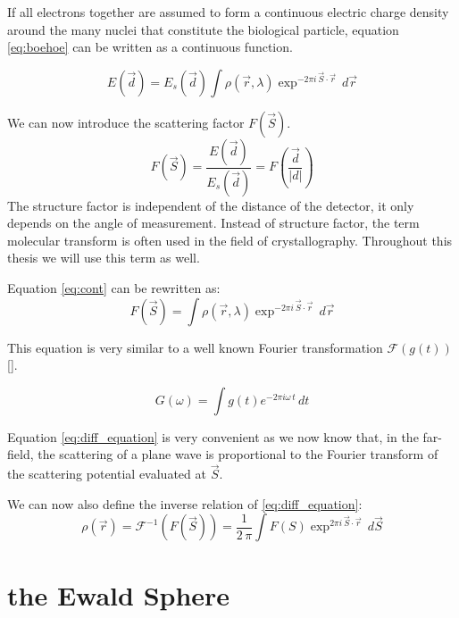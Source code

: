 If all electrons together are assumed to form a continuous electric charge density around the many nuclei that constitute the biological particle, equation \ref{eq:boehoe}  can be written as a continuous function. 

\begin{equation}\label{eq:cont}
E(\vec{d}) = E_s(\vec{d})\int \rho(\vec{r},\lambda) \exp^{-2\pi i \,\vec{S} \cdot \vec{r}}\,d\vec{r}
\end{equation}

We can now introduce the scattering factor $F(\vec{S})$.
\begin{equation}
F\left(\vec{S}\right) = \frac{E(\vec{d})}{E_s(\vec{d})} = F\left(\frac{\vec{d}}{|d|}\right)
\end{equation}
The structure factor is independent of the distance of the detector, it only depends on the angle of measurement. Instead of structure factor, the term molecular transform is often used in the field of crystallography. Throughout this thesis we will use this term as well.

Equation \ref{eq:cont} can be rewritten as:
\begin{equation}\label{eq:diff_equation}
F(\vec{S}) = \int \rho(\vec{r},\lambda) \exp^{-2\pi i \,\vec{S} \cdot \vec{r}}\,d\vec{r}
\end{equation}

This equation is very similar to a well known Fourier transformation $\mathcal{F}( g( t ) )$ []. 

\begin{equation}
 G(\omega) = \int g(t) e^{-2 \pi i \omega\, t}\,dt
\end{equation}

Equation \ref{eq:diff_equation} is very convenient as we now know that, in the far-field, the scattering of a plane wave is proportional to the Fourier transform of the scattering potential evaluated at $\vec{S}$.

We can now also define the inverse relation of \ref{eq:diff_equation}:
\begin{equation}
\rho(\vec{r}) = \mathcal{F}^{-1} ( F(\vec{S}) ) = \frac{1}{2\,\pi}\int F(S) \exp^{2\pi i \,\vec{S} \cdot \vec{r}}\,d\vec{S}
\end{equation}


\section{the Ewald Sphere}

